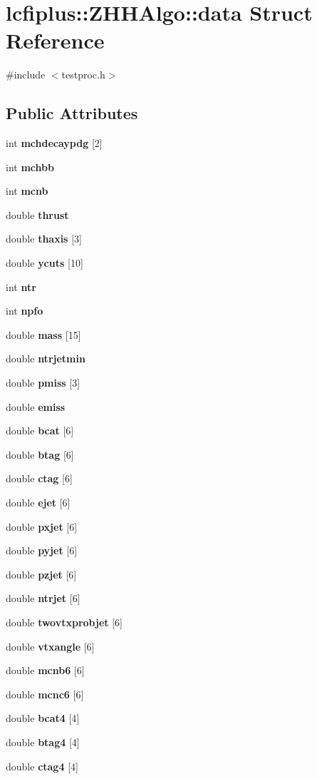 \section{lcfiplus\-:\-:Z\-H\-H\-Algo\-:\-:data Struct Reference}
\label{structlcfiplus_1_1ZHHAlgo_1_1data}


{\ttfamily \#include $<$testproc.\-h$>$}

\subsection*{Public Attributes}
\begin{DoxyCompactItemize}
\item 
int {\bf mchdecaypdg} [2]
\item 
int {\bf mchbb}
\item 
int {\bf mcnb}
\item 
double {\bf thrust}
\item 
double {\bf thaxis} [3]
\item 
double {\bf ycuts} [10]
\item 
int {\bf ntr}
\item 
int {\bf npfo}
\item 
double {\bf mass} [15]
\item 
double {\bf ntrjetmin}
\item 
double {\bf pmiss} [3]
\item 
double {\bf emiss}
\item 
double {\bf bcat} [6]
\item 
double {\bf btag} [6]
\item 
double {\bf ctag} [6]
\item 
double {\bf ejet} [6]
\item 
double {\bf pxjet} [6]
\item 
double {\bf pyjet} [6]
\item 
double {\bf pzjet} [6]
\item 
double {\bf ntrjet} [6]
\item 
double {\bf twovtxprobjet} [6]
\item 
double {\bf vtxangle} [6]
\item 
double {\bf mcnb6} [6]
\item 
double {\bf mcnc6} [6]
\item 
double {\bf bcat4} [4]
\item 
double {\bf btag4} [4]
\item 
double {\bf ctag4} [4]
\item 

\end{DoxyCompactItemize}
